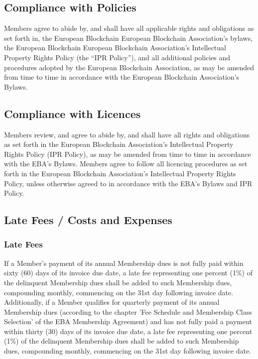 \documentclass{article}
\begin{document}
\subsection{Compliance with Policies}

Members agree to abide by, and shall have all applicable rights and obligations as set forth in, the European Blockchain European Blockchain Association’s bylaws, the European Blockchain European Blockchain Association’s Intellectual Property Rights Policy (the “IPR Policy”), and all additional policies and procedures adopted by the European Blockchain Association, as may be amended from time to time in accordance with the European Blockchain Association’s Bylaws.

\subsection{Compliance with Licences}

Members review, and agree to abide by, and shall have all rights and obligations as set forth in the European Blockchain Association’s Intellectual Property Rights Policy (IPR Policy), as may be amended from time to time in accordance with the EBA’s Bylaws. 
Members agree to follow all licencing procedures as set forth in the European Blockchain Association’s Intellectual Property Rights Policy, unless otherwise agreed to in accordance with the EBA’s Bylaws and IPR Policy.

\subsection{Late Fees / Costs and Expenses}

\subsubsection{Late Fees}

If a Member’s payment of its annual Membership dues is not fully paid within sixty (60) days of its invoice due date, a late fee representing one percent (1\%) of the delinquent Membership dues shall be added to such Membership dues, compounding monthly, commencing on the 31st day following invoice date.
 Additionally, if a Member qualifies for quarterly payment of its annual Membership dues (according to the chapter 'Fee Schedule and Membership Class Selection' of the EBA Membership Agreement) and has not fully paid a payment within thirty (30) days of its invoice due date, a late fee representing one percent (1\%) of the delinquent Membership dues shall be added to such Membership dues, compounding monthly, commencing on the 31st day following invoice date.
\end{document}
